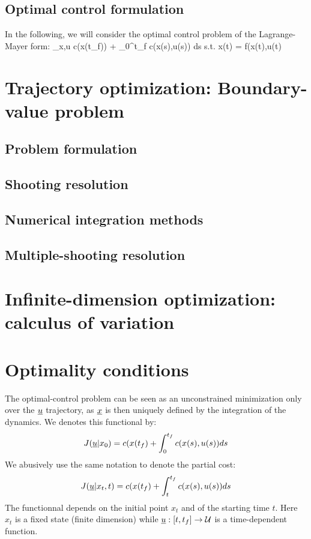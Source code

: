 \documentclass{book}
\begin{document}
\subsection{Optimal control formulation}

In the following, we will consider the optimal control problem of the Lagrange-Mayer form:
 \min_{\traj x,\traj u} c(x(t_f)) + \int_0^{t_f} c(x(s),u(s)) ds
\EOUT
{} s.t. \quad \dot x(t) = f(x(t),u(t) \EOUT

\section{Trajectory optimization: Boundary-value problem}

\subsection{Problem formulation}
\subsection{Shooting resolution}
\subsection{Numerical integration methods}
\subsection{Multiple-shooting resolution}

\section{Infinite-dimension optimization: calculus of variation }

\section{Optimality conditions}

The optimal-control problem can be seen as an unconstrained minimization only over the $\underline{u}$ trajectory, as $\underline{x}$ is then uniquely defined by the integration of the dynamics. We denotes this functional by:
$$ J(\underline{u}|x_0) = c(x(t_f) + \int_0^{t_f} c(x(s),u(s)) ds $$
We abusively use the same notation to denote the partial cost:
$$ J(\underline{u}|x_t,t) = c(x(t_f) + \int_t^{t_f} c(x(s),u(s)) ds $$
The functionnal depends on the initial point $x_t$ and of the starting time $t$. Here $x_t$ is a fixed state (finite dimension) while $\underline{u}: [t,t_f] \rightarrow \mathcal{U}$ is a time-dependent function. 
\end{document}
